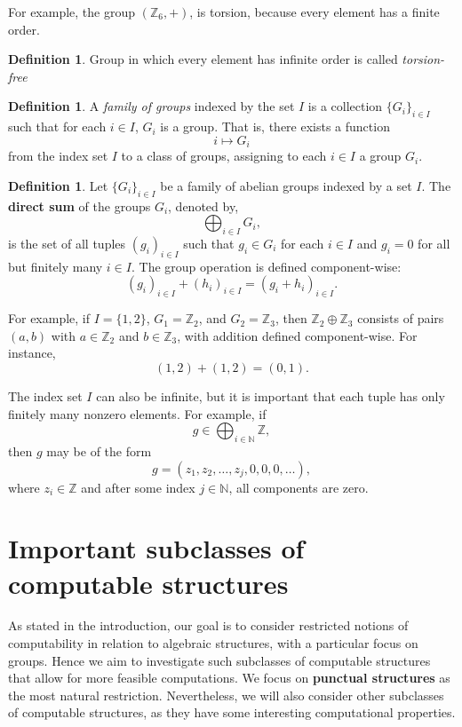 \documentclass{pracalicmgr2025}
\theoremstyle{plain}            %
\theoremstyle{remark}           %
\theoremstyle{definition}       %
\newtheorem{definition}[theorem]{Definition}
\begin{document}
\noindent For example, the group $(\mathbb{Z}_6,+)$, is torsion, because every element has a finite order.

\begin{definition}
    Group in which every element has infinite order is called \emph{torsion-free}
\end{definition}

\begin{definition} \label{Def 3.11}
A \emph{family of groups} indexed by the set $I$ is a collection $\{G_i\}_{i \in I}$ such that for each $i \in I$, $G_i$ is a group.  
That is, there exists a function
$$
i \mapsto G_i
$$
from the index set $I$ to a class of groups, assigning to each $i \in I$ a group $G_i$.
\end{definition}

\begin{definition} \label{Def 2.16}\label{direct sum}
Let $\{G_i\}_{i \in I}$ be a family of abelian groups indexed by a set $I$. The \textbf{direct sum} of the groups $G_i$, denoted by,
$$
\bigoplus_{i \in I} G_i,
$$
is the set of all tuples $(g_i)_{i \in I}$ such that $g_i \in G_i$ for each $i \in I$ and $g_i = 0$ for all but finitely many $i \in I$. The group operation is defined component-wise:
$$
(g_i)_{i \in I} + (h_i)_{i \in I} = (g_i + h_i)_{i \in I}.
$$
\end{definition}
\medskip
For example, if $I = \{1,2\}$, $G_1 = \mathbb{Z}_2$, and $G_2 = \mathbb{Z}_3$, then $
\mathbb{Z}_2 \oplus \mathbb{Z}_3$ consists of pairs $(a,b)$ with $a \in \mathbb{Z}_2$ and $b \in \mathbb{Z}_3$, with addition defined component-wise. For instance,
$$
(1,2) + (1,2) = (0,1).
$$

The index set $I$ can also be infinite, but it is important that each tuple has only finitely many nonzero elements. For example, if 
$$
g \in \bigoplus_{i \in \mathbb{N}} \mathbb{Z},
$$ 
then $g$ may be of the form 
$$
g = (z_1, z_2, \dots, z_j, 0, 0, 0, \dots),
$$ 
where $z_i \in \mathbb{Z}$ and after some index $j \in \mathbb{N}$, all components are zero.




\chapter{Important subclasses of computable structures}
As stated in the introduction, our goal is to consider restricted notions of computability in relation to algebraic structures, with a particular focus on groups. Hence we aim to investigate such subclasses of computable structures that allow for more feasible computations. We focus on \textbf{punctual structures} as the most natural restriction. Nevertheless, we will also consider other subclasses of computable structures, as they have some interesting computational properties. 
\end{document}
